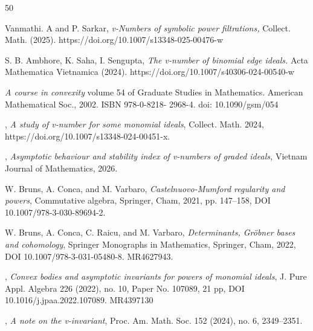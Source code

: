 \documentclass[11pt,reqno,a4paper]{amsart}
\theoremstyle{definition}
\begin{document}
\begin{thebibliography}{50}



  




 {Vanmathi. A and P. Sarkar},\textit{ v-Numbers of symbolic power filtrations,} 
Collect. Math. (2025). https://doi.org/10.1007/s13348-025-00476-w



 {S. B. Ambhore, K. Saha, I. Sengupta,} \textit {The v-number of binomial edge ideals.} Acta Mathematica
Vietnamica (2024). https://doi.org/10.1007/s40306-024-00540-w




\textit{ A course in convexity} volume 54 of Graduate Studies in
Mathematics. American Mathematical Soc., 2002. ISBN 978-0-8218-
2968-4. doi: 10.1090/gsm/054



 , \textit{ A study of v-number for some monomial ideals}, Collect. Math. 2024, https://doi.org/10.1007/s13348-024-00451-x.




, \textit{Asymptotic behaviour and stability index of v-numbers of graded ideals,} Vietnam Journal of Mathematics, 2026.


 W. Bruns, A. Conca, and M. Varbaro, \textit{Castelnuovo-Mumford regularity and powers}, Commutative algebra, Springer, Cham, 2021, pp. 147–158, DOI 10.1007/978-3-030-89694-2.

 W. Bruns, A. Conca, C. Raicu, and M. Varbaro, \textit{Determinants, Gr\"obner bases and cohomology}, Springer Monographs in Mathematics, Springer, Cham, 2022, DOI 10.1007/978-3-031-05480-8. MR4627943.



,\textit{ Convex bodies and asymptotic invariants for powers of monomial ideals}, J. Pure Appl. Algebra 226 (2022), no. 10, Paper No. 107089, 21 pp, DOI
10.1016/j.jpaa.2022.107089. MR4397130







, \textit{ A note on the v-invariant}, Proc. Am. Math. Soc. 152 (2024), no. 6, 2349–2351.


\end{thebibliography}
\end{document}

